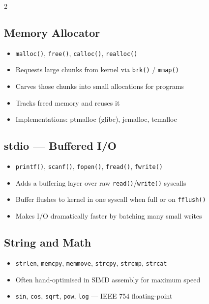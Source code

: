 2\documentclass[11pt,a4paper]{article}
\begin{document}
\subsection{Memory Allocator}
\begin{itemize}[noitemsep]
  \item \texttt{malloc()}, \texttt{free()}, \texttt{calloc()}, \texttt{realloc()}
  \item Requests large chunks from kernel via \texttt{brk()} / \texttt{mmap()}
  \item Carves those chunks into small allocations for programs
  \item Tracks freed memory and reuses it
  \item Implementations: ptmalloc (glibc), jemalloc, tcmalloc
\end{itemize}

\subsection{stdio --- Buffered I/O}
\begin{itemize}[noitemsep]
  \item \texttt{printf()}, \texttt{scanf()}, \texttt{fopen()}, \texttt{fread()}, \texttt{fwrite()}
  \item Adds a buffering layer over raw \texttt{read()}/\texttt{write()} syscalls
  \item Buffer flushes to kernel in one syscall when full or on \texttt{fflush()}
  \item Makes I/O dramatically faster by batching many small writes
\end{itemize}

\subsection{String and Math}
\begin{itemize}[noitemsep]
  \item \texttt{strlen}, \texttt{memcpy}, \texttt{memmove}, \texttt{strcpy}, \texttt{strcmp}, \texttt{strcat}
  \item Often hand-optimised in SIMD assembly for maximum speed
  \item \texttt{sin}, \texttt{cos}, \texttt{sqrt}, \texttt{pow}, \texttt{log} --- IEEE 754 floating-point
\end{itemize}
\end{document}
